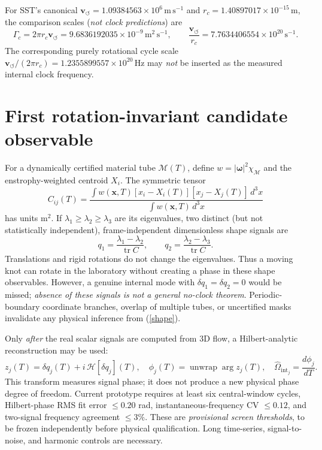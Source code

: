 \documentclass[11pt,a4paper]{article}
\newcommand{\vswirl}{\mathbf{v}_{\!\boldsymbol{\circlearrowleft}}}
\newcommand{\Omint}{\Omega_{\mathrm{int}}}
\begin{document}
For SST's canonical $\vswirl=1.09384563\times10^6\,\mathrm{m\,s^{-1}}$ and $r_c=1.40897017\times10^{-15}\,\mathrm m$, the comparison scales (\emph{not clock predictions}) are
\begin{equation}
\Gamma_c=2\pi r_c\vswirl=9.6836192035\times10^{-9}\,\mathrm{m^2\,s^{-1}},\qquad
\frac{\vswirl}{r_c}=7.7634406554\times10^{20}\,\mathrm{s^{-1}}.
\end{equation}
The corresponding purely rotational cycle scale $\vswirl/(2\pi r_c)=1.2355899557\times10^{20}\,\mathrm{Hz}$ may \emph{not} be inserted as the measured internal clock frequency.

\section{First rotation-invariant candidate observable}
For a dynamically certified material tube $\mathcal M(T)$, define $w=|\boldsymbol\omega|^2\chi_{\mathcal M}$ and the enstrophy-weighted centroid $X_i$. The symmetric tensor
\begin{equation}
C_{ij}(T)=\frac{\int w(\mathbf x,T)[x_i-X_i(T)][x_j-X_j(T)]\,d^3x}
{\int w(\mathbf x,T)\,d^3x}
\end{equation}
has units $\mathrm{m^2}$. If $\lambda_1\ge\lambda_2\ge\lambda_3$ are its eigenvalues, two distinct (but not statistically independent), frame-independent dimensionless shape signals are
\begin{equation}
q_1=\frac{\lambda_1-\lambda_2}{\operatorname{tr}C},\qquad
q_2=\frac{\lambda_2-\lambda_3}{\operatorname{tr}C}.\label{shape}
\end{equation}
Translations and rigid rotations do not change the eigenvalues. Thus a moving knot can rotate in the laboratory without creating a phase in these shape observables. However, a genuine internal mode with $\delta q_1=\delta q_2=0$ would be missed; \emph{absence of these signals is not a general no-clock theorem}. Periodic-boundary coordinate branches, overlap of multiple tubes, or uncertified masks invalidate any physical inference from (\ref{shape}).

Only \emph{after} the real scalar signals are computed from 3D flow, a Hilbert-analytic reconstruction may be used:
\begin{equation}
 z_j(T)=\delta q_j(T)+i\,\mathcal H[\delta q_j](T),\quad
 \phi_j(T)=\operatorname{unwrap}\arg z_j(T),\quad
 \widehat\Omint_j=\frac{d\phi_j}{dT}.
\end{equation}
This transform measures signal phase; it does not produce a new physical phase degree of freedom. Current prototype requires at least six central-window cycles, Hilbert-phase RMS fit error $\leq0.20$ rad, instantaneous-frequency CV $\leq0.12$, and two-signal frequency agreement $\leq3\%$. These are \emph{provisional screen thresholds}, to be frozen independently before physical qualification. Long time-series, signal-to-noise, and harmonic controls are necessary.
\end{document}
